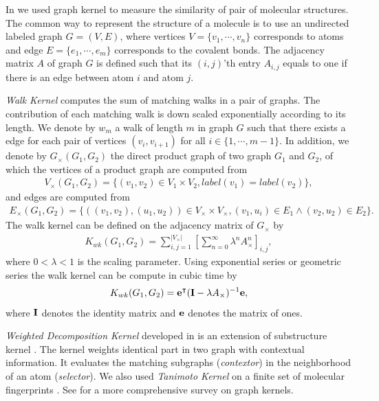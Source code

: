 {%
In  we used graph kernel to measure the similarity of pair of molecular structures.
The common way to represent the structure of a molecule is to use an undirected labeled graph $G=(V,E)$, where vertices $V=\{v_1,\cdots,v_n\}$ corresponds to atoms and edge $E=\{e_1,\cdots,e_m\}$ corresponds to the covalent bonds.
The adjacency matrix $A$ of graph $G$ is defined such that its $(i,j)$'th entry $A_{i,j}$ equals to one if there is an edge between atom $i$ and atom $j$.

\textit{Walk Kernel} \citep{Kashima03marginalized,Gartner03a} computes the sum of matching walks in a pair of graphs. 
The contribution of each matching walk is down scaled exponentially according to its length.  
We denote by $w_m$ a walk of length $m$ in graph $G$ such that there exists a edge for each pair of vertices $(v_i,v_{i+1})$ for all $i\in\{1,\cdots,m-1\}$.
In addition, we denote by $G_{\times}(G_1,G_2)$ the direct product graph of two graph $G_1$ and $G_2$, of which the vertices of a product graph are computed from 
\begin{align*}
	V_{\times}(G_1,G_2) = \{(v_1,v_2)\in V_1\times V_2, label(v_1)=label(v_2)\},
\end{align*}
and edges are computed from
\begin{align*}
	E_{\times}(G_1,G_2) = \{((v_1,v_2),(u_1,u_2))\in V_{\times}\times V_{\times},(v_1,u_i)\in E_1\wedge (v_2,u_2)\in E_2\}.
\end{align*}
The walk kernel can be defined on the adjacency matrix of $G_{\times}$ by
\begin{align*}
	K_{wk}(G_1,G_2) = \sum_{i,j=1}^{|V_{\times}|}\left[\sum_{n=0}^{\infty}\lambda^{n}A_{\times}^n\right]_{i,j},
\end{align*}
where $0<\lambda<1$ is the scaling parameter.
Using exponential series or geometric series the walk kernel can be compute in cubic time \citep{Gartner03a} by
\begin{align*}
	K_{wk}(G_1,G_2) = \mathbf {e}^{\intercal}(\mathbf{I}-\lambda A_{\times})^{-1}\mathbf {e},
\end{align*}
where $\mathbf{I}$ denotes the identity matrix and $\mathbf {e}$ denotes the matrix of ones.

\textit{Weighted Decomposition Kernel} developed in \citep{Menchetti05weighted,Ceroni08classification} is an extension of substructure kernel \citep{Haussler99convolution}.
The kernel weights identical part in two graph with contextual information.
It evaluates the matching subgraphs (\textit{contextor}) in the neighborhood of an atom (\textit{selector}).
We also used \textit{Tanimoto Kernel} \citep{Ralaivola05graph} on a finite set of molecular fingerprints \citep{Wang09pubchem}.
See \citep{Vishwanathan10graph} for a more comprehensive survey on graph kernels.

}
